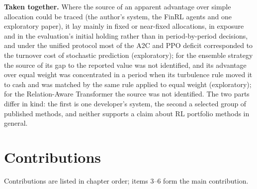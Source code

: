 \documentclass[12pt,a4paper]{report}
\begin{document}
\textbf{Taken together.} Where the source of an apparent advantage over
simple allocation could be traced (the author's system, the FinRL agents
and one exploratory paper), it lay mainly in fixed or near-fixed
allocations, in exposure and in the evaluation's initial holding rather
than in period-by-period decisions, and under the unified protocol most
of the A2C and PPO deficit corresponded to the turnover cost of
stochastic prediction (exploratory); for the ensemble strategy the
source of its gap to the reported value was not identified, and its
advantage over equal weight was concentrated in a period when its
turbulence rule moved it to cash and was matched by the same rule
applied to equal weight (exploratory); for the Relation-Aware
Transformer the source was not identified. The two parts differ in kind:
the first is one developer's system, the second a selected group of
published methods, and neither supports a claim about RL portfolio
methods in general.

\section{Contributions}\label{contributions}

Contributions are listed in chapter order; items 3--6 form the main
contribution.
\end{document}
